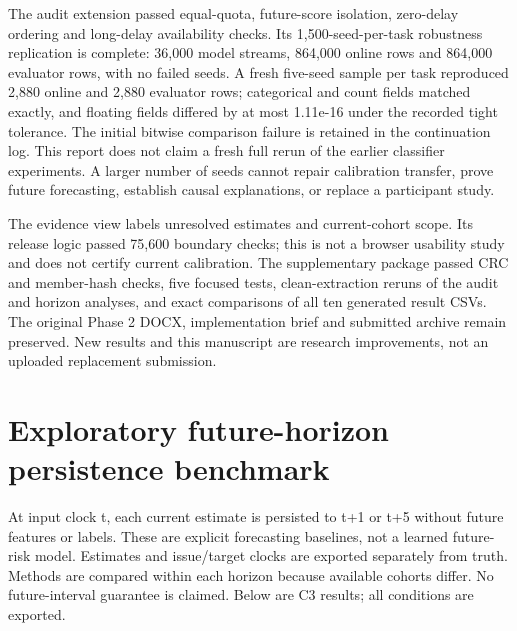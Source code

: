 \documentclass[11pt,a4paper]{article}
\begin{document}
The audit extension passed equal-quota, future-score isolation, zero-delay ordering and long-delay availability checks. Its 1,500-seed-per-task robustness replication is complete: 36,000 model streams, 864,000 online rows and 864,000 evaluator rows, with no failed seeds. A fresh five-seed sample per task reproduced 2,880 online and 2,880 evaluator rows; categorical and count fields matched exactly, and floating fields differed by at most 1.11e-16 under the recorded tight tolerance. The initial bitwise comparison failure is retained in the continuation log. This report does not claim a fresh full rerun of the earlier classifier experiments. A larger number of seeds cannot repair calibration transfer, prove future forecasting, establish causal explanations, or replace a participant study.\par

The evidence view labels unresolved estimates and current-cohort scope. Its release logic passed 75,600 boundary checks; this is not a browser usability study and does not certify current calibration. The supplementary package passed CRC and member-hash checks, five focused tests, clean-extraction reruns of the audit and horizon analyses, and exact comparisons of all ten generated result CSVs. The original Phase 2 DOCX, implementation brief and submitted archive remain preserved. New results and this manuscript are research improvements, not an uploaded replacement submission.\par


\section{Exploratory future-horizon persistence benchmark}

At input clock t, each current estimate is persisted to t+1 or t+5 without future features or labels. These are explicit forecasting baselines, not a learned future-risk model. Estimates and issue/target clocks are exported separately from truth. Methods are compared within each horizon because available cohorts differ. No future-interval guarantee is claimed. Below are C3 results; all conditions are exported.\par
\end{document}
